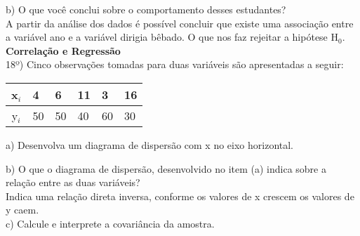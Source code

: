 \documentclass[12pt,a4paper]{article}
\begin{document}
	\vspace{1cm}
	b) O que você conclui sobre o comportamento desses estudantes?
	\vspace{0.5cm}\\
	A partir da análise dos dados é possível concluir que existe uma associação entre a variável ano e a variável dirigia bêbado. O que nos faz rejeitar a hipótese H$_{0}$.
	\vspace{1cm}\\
	\textbf{Correlação e Regressão}\\
	18º) Cinco observações tomadas para duas variáveis são apresentadas a seguir:
	\begin{center}
		\begin{tabular}{|c|l|l|l|l|l|}\hline
			x$_{i}$ & 4 & 6 & 11 & 3 & 16\\ \hline
			y$_{i}$ & 50 & 50 & 40 & 60 & 30\\ \hline
		\end{tabular}
	\end{center}
	a) Desenvolva um diagrama de dispersão com x no eixo horizontal.
	\begin{center}	
	\end{center}
	\vspace{1cm}
	b) O que o diagrama de dispersão, desenvolvido no item (a) indica sobre a relação	entre as duas variáveis?
	\vspace{0.5cm}\\
	Indica uma relação direta inversa, conforme os valores de x crescem os valores de y caem.
	\vspace{1cm}\\
	c) Calcule e interprete a covariância da amostra.
\end{document}
